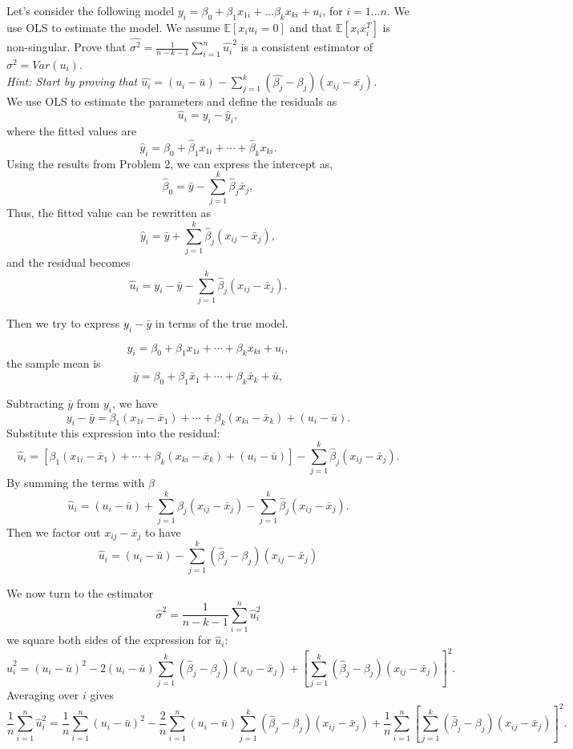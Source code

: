 \documentclass[12pt]{article}
\begin{document}
\begin{flushleft}
Let's consider the following model $y_i=\beta_0+\beta_1x_{1i}+...\beta_{k}x_{ki}+u_i$, for $i=1...n$. We use OLS to estimate the model. We assume $\mathbb{E}[x_i u_i=0]$ and that $\mathbb{E}[x_i x_i^T]$ is non-singular. Prove that $\hat{\sigma^2}=\frac{1}{n-k-1}\sum_{i=1}^n \hat{u_i}^2$ is a consistent estimator of $\sigma^2=Var(u_i)$.\\
\textit{Hint: Start by proving that $\hat{u_i}=(u_i-\bar{u})-\sum_{j=1}^k(\hat{\beta_j}-\beta_j)(x_{ij}-\bar{x_j})$.}\\
We use OLS to estimate the parameters and define the residuals as
\[
\hat{u}_i = y_i - \hat{y}_i,
\]
where the fitted values are
\[
\hat{y}_i = \hat{\beta}_0 + \hat{\beta}_1 x_{1i} + \cdots + \hat{\beta}_k x_{ki}.
\]
Using the results from Problem 2, we can express the intercept as,
\[
\hat{\beta}_0 = \bar{y} - \sum_{j=1}^k \hat{\beta}_j \bar{x}_j,
\]
Thus, the fitted value can be rewritten as
\[
\hat{y}_i = \bar{y} + \sum_{j=1}^k \hat{\beta}_j (x_{ij}-\bar{x}_j),
\]
and the residual becomes
\[
\hat{u}_i = y_i - \bar{y} - \sum_{j=1}^k \hat{\beta}_j (x_{ij}-\bar{x}_j).
\]

Then we try to express $y_i - \bar{y}$ in terms of the true model.

\[
y_i = \beta_0 + \beta_1 x_{1i} + \cdots + \beta_k x_{ki} + u_i,
\]
the sample mean is
\[
\bar{y} = \beta_0 + \beta_1 \bar{x}_1 + \cdots + \beta_k \bar{x}_k + \bar{u},
\]

Subtracting $\bar{y}$ from $y_i$, we have
\[
y_i - \bar{y} = \beta_1 (x_{1i}-\bar{x}_1) + \cdots + \beta_k (x_{ki}-\bar{x}_k) + (u_i-\bar{u}).
\]
Substitute this expression into the residual:
\[
\hat{u}_i = \left[\beta_1 (x_{1i}-\bar{x}_1) + \cdots + \beta_k (x_{ki}-\bar{x}_k) + (u_i-\bar{u})\right] - \sum_{j=1}^k \hat{\beta}_j (x_{ij}-\bar{x}_j).
\]
By summing the terms with $\beta$
\[
\hat{u}_i = (u_i-\bar{u}) + \sum_{j=1}^k \beta_j (x_{ij}-\bar{x}_j) - \sum_{j=1}^k \hat{\beta}_j (x_{ij}-\bar{x}_j).
\]
Then we factor out $x_{ij}-\bar{x}_j$ to have
\[
\hat{u}_i = (u_i-\bar{u}) - \sum_{j=1}^k (\hat{\beta}_j-\beta_j)(x_{ij}-\bar{x}_j)
\]

We now turn to the estimator
\[
\hat{\sigma}^2 = \frac{1}{n-k-1}\sum_{i=1}^n \hat{u}_i^2
\]
we square both sides of the expression for $\hat{u}_i$:
\[
\hat{u}_i^2 = (u_i-\bar{u})^2 - 2(u_i-\bar{u})\sum_{j=1}^k (\hat{\beta}_j-\beta_j)(x_{ij}-\bar{x}_j) + \left[\sum_{j=1}^k (\hat{\beta}_j-\beta_j)(x_{ij}-\bar{x}_j)\right]^2.
\]
Averaging over \(i\) gives
\[
\frac{1}{n}\sum_{i=1}^n \hat{u}_i^2 = \frac{1}{n}\sum_{i=1}^n (u_i-\bar{u})^2 - \frac{2}{n}\sum_{i=1}^n (u_i-\bar{u})\sum_{j=1}^k (\hat{\beta}_j-\beta_j)(x_{ij}-\bar{x}_j) + \frac{1}{n}\sum_{i=1}^n \left[\sum_{j=1}^k (\hat{\beta}_j-\beta_j)(x_{ij}-\bar{x}_j)\right]^2.
\]


\end{flushleft}
\end{document}
